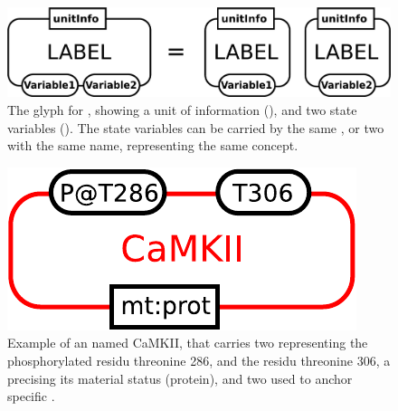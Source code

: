 \begin{figure}[H]
  \centering
  \includegraphics[scale = 0.3]{images/entity}
  \caption{The \ER glyph for , showing a unit of information (), and two state variables (). The state variables can be carried by the same , or two  with the same name, representing the same concept.}
  \label{fig:entity}
\end{figure}

\begin{figure}[H]
  \centering
  \includegraphics[scale = 0.5]{examples/ex-entity}
  \caption{Example of an  named CaMKII, that carries two  representing the phosphorylated residu threonine 286, and the residu threonine 306, a  precising its material status (protein), and two  used to anchor specific .}
  \label{fig:ex-entity}
\end{figure}

